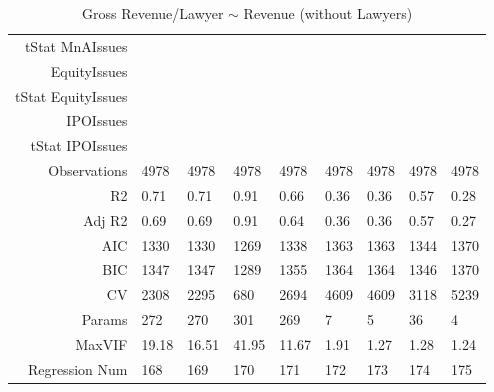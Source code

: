\begin{table}[ht]
\begin{tabular}{rllllllll}
  tStat MnAIssues &  &  &  &  &  &  &  &  \\ 
  EquityIssues &  &  &  &  &  &  &  &  \\ 
  tStat EquityIssues &  &  &  &  &  &  &  &  \\ 
  IPOIssues &  &  &  &  &  &  &  &  \\ 
  tStat IPOIssues &  &  &  &  &  &  &  &  \\ 
  Observations & 4978 & 4978 & 4978 & 4978 & 4978 & 4978 & 4978 & 4978 \\ 
  R2 & 0.71 & 0.71 & 0.91 & 0.66 & 0.36 & 0.36 & 0.57 & 0.28 \\ 
  Adj R2 & 0.69 & 0.69 & 0.91 & 0.64 & 0.36 & 0.36 & 0.57 & 0.27 \\ 
  AIC & 1330 & 1330 & 1269 & 1338 & 1363 & 1363 & 1344 & 1370 \\ 
  BIC & 1347 & 1347 & 1289 & 1355 & 1364 & 1364 & 1346 & 1370 \\ 
  CV & 2308 & 2295 & 680 & 2694 & 4609 & 4609 & 3118 & 5239 \\ 
  Params & 272 & 270 & 301 & 269 & 7 & 5 & 36 & 4 \\ 
  MaxVIF & 19.18 & 16.51 & 41.95 & 11.67 & 1.91 & 1.27 & 1.28 & 1.24 \\ 
  Regression Num & 168 & 169 & 170 & 171 & 172 & 173 & 174 & 175 \\ 
   \hline
\end{tabular}
\caption{Gross Revenue/Lawyer $\sim$ Revenue (without Lawyers)} 
\end{table}
